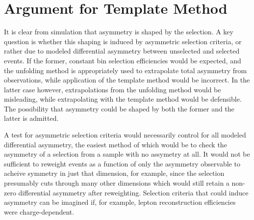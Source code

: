 \documentclass[letterpaper,11pt]{article}
\newcommand{\selected}{{\ensuremath s}}
\begin{document}
%

\section{Argument for Template Method}

It is clear from simulation that asymmetry is shaped by the selection.
A key question is whether this shaping is induced by asymmetric
selection criteria, or rather due to modeled differential asymmetry
between unselected and selected events.  If the former, constant bin
selection efficiencies would be expected, and the unfolding method is
appropriately used to extrapolate total asymmetry from observations,
while application of the template method would be incorrect.  In the
latter case however, extrapolations from the unfolding method would be
misleading, while extrapolating with the template method would be
defensible.  The possibility that asymmetry could be shaped by both
the former and the latter is admitted.

A test for asymmetric selection criteria would necessarily control for
all modeled differential asymmetry, the easiest method of which would
be to check the asymmetry of a selection from a sample with no
assymetry at all. It would not be sufficient to reweight events as a
function of only the asymmetry observable to acheive symmetry in just
that dimension, for example, since the selection presumably cuts
through many other dimensions which would still retain a non-zero
differential asymmetry after reweighting.  Selection criteria that
could induce asymmetry can be imagined if, for example, lepton
reconstruction efficiencies were charge-dependent.
\end{document}
